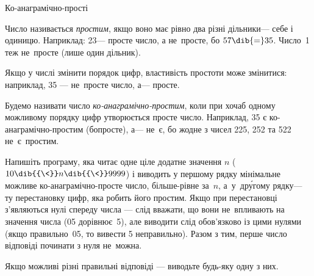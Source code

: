 \begin{problemAllDefault}{Ко-анаграмічно-прості}

Число називається \emph{простим}, якщо воно має рівно два різні дільники\nolinebreak[3] --- себе і одиницю. Наприклад: 23\nolinebreak[3] --- просте число, а не~просте, бо $5{\*}7\dib{{=}}35$. Число~1 теж не~просте (лише один дільник).

Якщо у числі змінити порядок цифр, властивість простоти може змінитися: наприклад, 35 --- не~просте число, а\nolinebreak[3] --- просте.

Будемо називати число \emph{ко-анаграмічно-простим}, коли при хоча\nolinebreak[3] б одному можливому порядку цифр утворюється просте число. Наприклад, 35 є ко-анаграмічно-простим (бо\nolinebreak[3] просте), а\nolinebreak[3] --- не~є, бо жодне з чисел 225, 252 та 522 не~є~простим.

Напишіть програму, яка читає одне ціле додатне значення $n$ ($10\dib{{\<}}n\dib{{\<}}9999$) і виводить у першому рядку мінімальне можливе ко-анаграмічно-просте число, більше-рівне за~$n$, а~у~др\'{у}гому рядку\nolinebreak[3] --- ту перестановку цифр, яка робить його простим. Якщо при перестановці з’являються нулі спереду числа --- слід вважати, що вони не~впливають на значення числа (05 дорівнює~5), але виводити слід обов’язково із цими нулями (якщо правильно~05, то вивести 5 неправильно). Разом з тим, перше число відповіді починати з нуля не~можна.

Якщо можливі різні правильні відповіді --- виводьте будь-яку одну з них.

\Examples

\noindent
\hspace*{-0.75em}
\begin{exampleSimple}{4em}{4em}%
%
\end{exampleSimple}
\hspace*{-2em}
\begin{exampleSimple}{4em}{4em}%
%
\end{exampleSimple}
\hspace*{-2em}
\begin{exampleSimple}{4em}{4em}%
%
\end{exampleSimple}
\hspace*{-1.5em}

\end{problemAllDefault}
